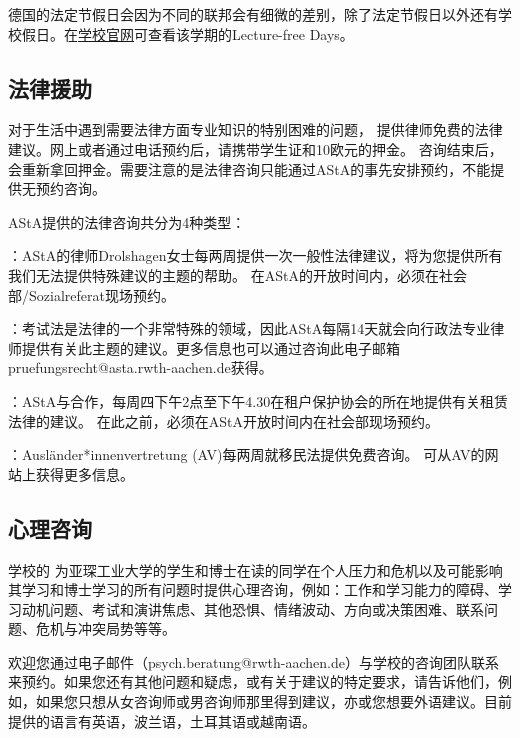     德国的法定节假日会因为不同的联邦会有细微的差别，除了法定节假日以外还有学校假日。在\href{https://www.rwth-aachen.de/cms/root/Studium/Im-Studium/~egv/Semestertermine/lidx/1/}{学校官网}可查看该学期的Lecture-free Days。

  \subsection{法律援助}\label{subsec:法律援助}

    对于生活中遇到需要法律方面专业知识的特别困难的问题，\href{https://www.asta.rwth-aachen.de/beratung/rechtsberatung/}{} 提供律师免费的法律建议。网上或者通过电话预约后，请携带学生证和10欧元的押金。 咨询结束后，会重新拿回押金。需要注意的是法律咨询只能通过AStA的事先安排预约，不能提供无预约咨询。

    AStA提供的法律咨询共分为4种类型：

    ：AStA的律师Drolshagen女士每两周提供一次一般性法律建议，将为您提供所有我们无法提供特殊建议的主题的帮助。 在AStA的开放时间内，必须在社会部/Sozialreferat现场预约。

    ：考试法是法律的一个非常特殊的领域，因此AStA每隔14天就会向行政法专业律师提供有关此主题的建议。更多信息也可以通过咨询此电子邮箱pruefungsrecht@asta.rwth-aachen.de获得。

    ：AStA与\href{https://mieterverein-aachen.de/}{}合作，每周四下午2点至下午4.30在租户保护协会的所在地提供有关租赁法律的建议。 在此之前，必须在AStA开放时间内在社会部现场预约。

    ：Ausländer*innenvertretung (AV)每两周就移民法提供免费咨询。 可从AV的网站上获得更多信息。

  \subsection{心理咨询}\label{subsec:心理咨询}

    学校的\href{https://www.rwth-aachen.de/cms/root/Studium/Beratung-Hilfe/~sei/Psychologische-Beratung/}{} 为亚琛工业大学的学生和博士在读的同学在个人压力和危机以及可能影响其学习和博士学习的所有问题时提供心理咨询，例如：工作和学习能力的障碍、学习动机问题、考试和演讲焦虑、其他恐惧、情绪波动、方向或决策困难、联系问题、危机与冲突局势等等。

    欢迎您通过电子邮件（psych.beratung@rwth-aachen.de）与学校的咨询团队联系来预约。如果您还有其他问题和疑虑，或有关于建议的特定要求，请告诉他们，例如，如果您只想从女咨询师或男咨询师那里得到建议，亦或您想要外语建议。目前提供的语言有英语，波兰语，土耳其语或越南语。

